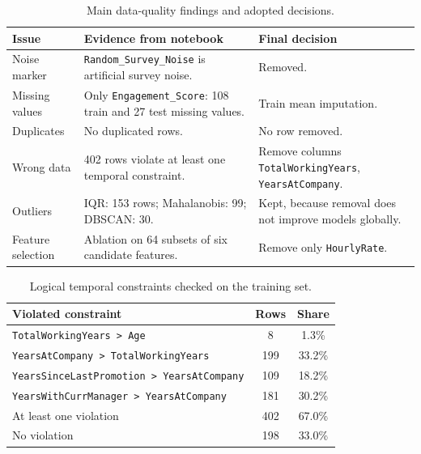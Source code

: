 \documentclass[lettersize,journal]{IEEEtran}
\begin{document}
\begin{table}[t]
\caption{Main data-quality findings and adopted decisions.}
\label{tab:prep}
\centering
\scriptsize
\setlength{\tabcolsep}{2.5pt}
\begin{tabular}{p{}p{}p{}}
\toprule
Issue & Evidence from notebook & Final decision \\
\midrule
Noise marker & \texttt{Random\_Survey\_Noise} is artificial survey noise. & Removed. \\
Missing values & Only \texttt{Engagement\_Score}: 108 train and 27 test missing values. & Train mean imputation. \\
Duplicates & No duplicated rows. & No row removed. \\
Wrong data & 402 rows violate at least one temporal constraint. & Remove columns \texttt{TotalWorkingYears}, \texttt{YearsAtCompany}. \\
Outliers & IQR: 153 rows; Mahalanobis: 99; DBSCAN: 30. & Kept, because removal does not improve models globally. \\
Feature selection & Ablation on 64 subsets of six candidate features. & Remove only \texttt{HourlyRate}. \\
\bottomrule
\end{tabular}
\end{table}

\begin{table}[t]
\caption{Logical temporal constraints checked on the training set.}
\label{tab:constraints}
\centering
\scriptsize
\setlength{\tabcolsep}{3pt}
\begin{tabular}{lcc}
\toprule
Violated constraint & Rows & Share \\
\midrule
\texttt{TotalWorkingYears > Age} & 8 & 1.3\% \\
\texttt{YearsAtCompany > TotalWorkingYears} & 199 & 33.2\% \\
\texttt{YearsSinceLastPromotion > YearsAtCompany} & 109 & 18.2\% \\
\texttt{YearsWithCurrManager > YearsAtCompany} & 181 & 30.2\% \\
At least one violation & 402 & 67.0\% \\
No violation & 198 & 33.0\% \\
\bottomrule
\end{tabular}
\end{table}
\end{document}
